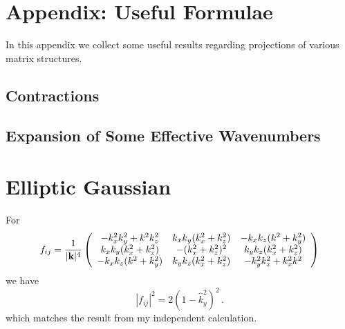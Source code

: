 \documentclass{revtex4}
\begin{document}
\section{Appendix: Useful Formulae}
In this appendix we collect some useful results regarding projections of various matrix structures.

\subsection{Contractions}

\subsection{Expansion of Some Effective Wavenumbers}

\section{Elliptic Gaussian}
For
\begin{equation}
  f_{ij} = \frac{1}{|{\bf k}|^4}\left(
  \begin{array}{ccc}
    -k_x^2k_y^2 + k^2k_z^2 & k_xk_y(k_x^2+k_z^2) & -k_xk_z(k^2+k_y^2) \\
    k_xk_y(k_x^2+k_z^2) & -(k_x^2+k_z^2)^2 & k_yk_z(k_x^2+k_z^2) \\
    -k_xk_z(k^2+k_y^2) & k_yk_z(k_x^2+k_z^2) & -k_y^2k_z^2 + k_x^2k^2 
  \end{array}\right)
\end{equation}
we have
\begin{equation}
  |f_{ij}|^2 = 2(1-\hat{k}_y^2)^2 \, .
\end{equation}
which matches the result from my independent calculation.
\end{document}
